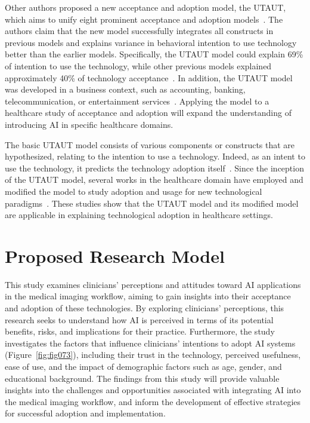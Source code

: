 Other authors proposed a new acceptance and adoption model, the \acf{UTAUT}, which aims to unify eight prominent acceptance and adoption models~\cite{info:doi/10.2196/27122}.
The authors claim that the new model successfully integrates all constructs in previous models and explains variance in behavioral intention to use technology better than the earlier models.
Specifically, the \ac{UTAUT} model could explain 69\% of intention to use the technology, while other previous models explained approximately 40\% of technology acceptance~\cite{CALISTO2022102922}.
In addition, the \ac{UTAUT} model was developed in a business context, such as accounting, banking, telecommunication, or entertainment services~\cite{KHALILZADEH2017460}.
Applying the model to a healthcare study of acceptance and adoption will expand the understanding of introducing AI in specific healthcare domains.

The basic \ac{UTAUT} model consists of various components or constructs that are hypothesized, relating to the intention to use a technology.
Indeed, as an intent to use the technology, it predicts the technology adoption itself~\cite{DEANGELI2020102412, HART201993}.
Since the inception of the \ac{UTAUT} model, several works in the healthcare domain have employed and modified the model to study adoption and usage for new technological paradigms~\cite{KHALILZADEH2017460}.
These studies show that the \ac{UTAUT} model and its modified model are applicable in explaining technological adoption in healthcare settings.

\section{Proposed Research Model}
\label{chap:app002002}

This study examines clinicians' perceptions and attitudes toward \ac{AI} applications in the medical imaging workflow, aiming to gain insights into their acceptance and adoption of these technologies.
By exploring clinicians' perceptions, this research seeks to understand how \ac{AI} is perceived in terms of its potential benefits, risks, and implications for their practice.
Furthermore, the study investigates the factors that influence clinicians' intentions to adopt \ac{AI} systems (Figure~\ref{fig:fig073}), including their trust in the technology, perceived usefulness, ease of use, and the impact of demographic factors such as age, gender, and educational background.
The findings from this study will provide valuable insights into the challenges and opportunities associated with integrating \ac{AI} into the medical imaging workflow, and inform the development of effective strategies for successful adoption and implementation.

